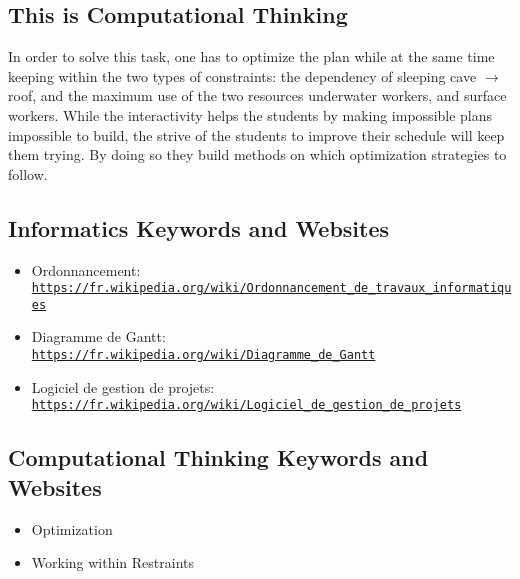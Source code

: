 \documentclass[a4paper,11pt]{report}
\newcommand{\BrochureUrlText}[1]{\texttt{#1}}
\begin{document}
\subsection*{This is Computational Thinking}

In order to solve this task, one has to optimize the plan while at the same time keeping within the two types of constraints: the dependency of sleeping cave \ensuremath{\rightarrow} roof, and the maximum use of the two resources underwater workers, and surface workers. While the interactivity helps the students by making impossible plans impossible to build, the strive of the students to improve their schedule will keep them trying. By doing so they build methods on which optimization strategies to follow.


\subsection*{Informatics Keywords and Websites}

\begin{itemize}
  \item Ordonnancement: \href{https://fr.wikipedia.org/wiki/Ordonnancement_de_travaux_informatiques}{\BrochureUrlText{https://fr.wikipedia.org/wiki/Ordonnancement\_de\_travaux\_informatiques}}
  \item Diagramme de Gantt: \href{https://fr.wikipedia.org/wiki/Diagramme_de_Gantt}{\BrochureUrlText{https://fr.wikipedia.org/wiki/Diagramme\_de\_Gantt}}
  \item Logiciel de gestion de projets: \href{https://fr.wikipedia.org/wiki/Logiciel_de_gestion_de_projets}{\BrochureUrlText{https://fr.wikipedia.org/wiki/Logiciel\_de\_gestion\_de\_projets}}
\end{itemize}


\subsection*{Computational Thinking Keywords and Websites}

\begin{itemize}
  \item Optimization
  \item Working within Restraints
\end{itemize}
\end{document}
